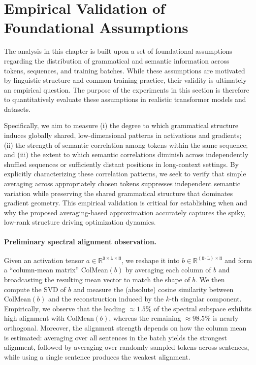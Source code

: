 \section{Empirical Validation of Foundational Assumptions}
\label{sec:empirical_validation_assumptions}

The analysis in this chapter is built upon a set of foundational assumptions
regarding the distribution of grammatical and semantic information across tokens,
sequences, and training batches.
While these assumptions are motivated by linguistic structure and common training
practice, their validity is ultimately an empirical question.
The purpose of the experiments in this section is therefore to quantitatively
evaluate these assumptions in realistic transformer models and datasets.

Specifically, we aim to measure (i) the degree to which grammatical structure induces
globally shared, low-dimensional patterns in activations and gradients; (ii) the
strength of semantic correlation among tokens within the same sequence; and (iii)
the extent to which semantic correlations diminish across independently shuffled
sequences or sufficiently distant positions in long-context settings.
By explicitly characterizing these correlation patterns, we seek to verify that
simple averaging across appropriately chosen tokens suppresses independent semantic
variation while preserving the shared grammatical structure that dominates gradient
geometry.
This empirical validation is critical for establishing when and why the proposed
averaging-based approximation accurately captures the spiky, low-rank structure
driving optimization dynamics.

\paragraph{Preliminary spectral alignment observation.}
Given an activation tensor $a\in\mathbb{R}^{\texttt{B}\times\texttt{L}\times\texttt{H}}$, we reshape it into
$b\in\mathbb{R}^{(\texttt{B}\cdot\texttt{L})\times\texttt{H}}$ and form a ``column-mean matrix''
$\mathrm{ColMean}(b)$ by averaging each column of $b$ and broadcasting the resulting mean vector to match the shape of $b$.
We then compute the SVD of $b$ and measure the (absolute) cosine similarity between $\mathrm{ColMean}(b)$ and the reconstruction induced by the $k$-th singular component.
Empirically, we observe that the leading $\approx 1.5\%$ of the spectral subspace exhibits high alignment with $\mathrm{ColMean}(b)$,
whereas the remaining $\approx 98.5\%$ is nearly orthogonal.
Moreover, the alignment strength depends on how the column mean is estimated: averaging over all sentences in the batch yields the
strongest alignment, followed by averaging over randomly sampled tokens across sentences, while using a single sentence produces the
weakest alignment.

